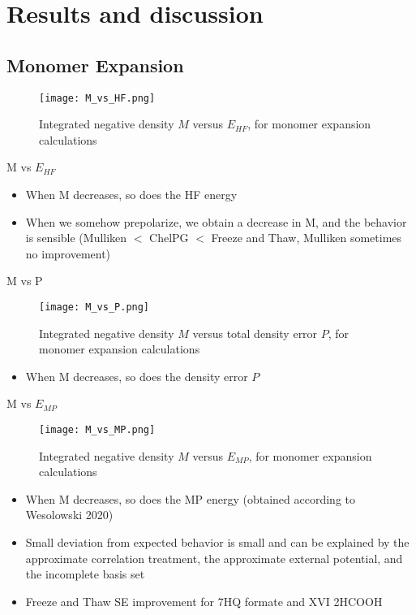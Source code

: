 \documentclass[journal=jctcce,manuscript=article, layout=onecolumn]{achemso}
\begin{document}
\section{Results and discussion}
\subsection{Monomer Expansion}
\begin{figure}[H]
\centering
\texttt{[image: M\_vs\_HF.png]}
\caption{Integrated negative density $M$ versus $E_{HF}$, for monomer expansion calculations}
\label{fig:M_VS_HF}
\end{figure}
M vs $E_{HF}$
\begin{itemize}
 \item When M decreases, so does the HF energy
 \item When we somehow prepolarize, we obtain a decrease in M, and the behavior is sensible (Mulliken $<$ ChelPG $<$ Freeze and Thaw, Mulliken sometimes no improvement)
\end{itemize}
M vs P
\begin{figure}[H]
\centering
\texttt{[image: M\_vs\_P.png]}
\caption{Integrated negative density $M$ versus total density error $P$, for monomer expansion calculations}
\label{fig:M_vs_P}
\end{figure}
\begin{itemize}
 \item When M decreases, so does the density error $P$
\end{itemize}
M vs $E_{MP}$
\begin{figure}[H]
\centering
\texttt{[image: M\_vs\_MP.png]}
\caption{Integrated negative density $M$ versus $E_{MP}$, for monomer expansion calculations}
\label{fig:M_vs_MP}
\end{figure}
\begin{itemize}
 \item When M decreases, so does the MP energy (obtained according to Wesolowski 2020)
 \item Small deviation from expected behavior is small and can be explained by the approximate correlation treatment, the approximate external potential, and the incomplete basis set
 \item Freeze and Thaw SE improvement for 7HQ formate and XVI 2HCOOH
\end{itemize}
\end{document}
